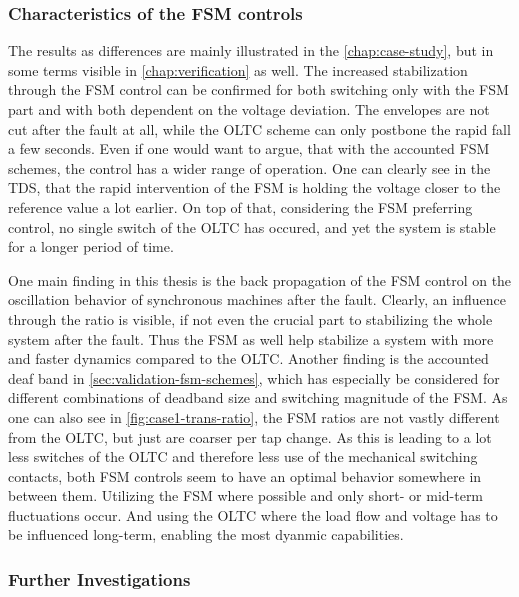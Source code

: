 \subsubsection{Characteristics of the FSM controls}

The results as differences are mainly illustrated in the \autoref{chap:case-study}, but in some terms visible in \autoref{chap:verification} as well.
The increased stabilization through the \acs{FSM} control can be confirmed for both switching only with the \acs{FSM} part and with both dependent on the voltage deviation.
The envelopes are not cut after the fault at all, while the \acs{OLTC} scheme can only postbone the rapid fall a few seconds.
Even if one would want to argue, that with the accounted \acs{FSM} schemes, the control has a wider range of operation.
One can clearly see in the \acs{TDS}, that the rapid intervention of the \acs{FSM} is holding the voltage closer to the reference value a lot earlier.
On top of that, considering the \acs{FSM} preferring control, no single switch of the \acs{OLTC} has occured, and yet the system is stable for a longer period of time.

One main finding in this thesis is the back propagation of the \acs{FSM} control on the oscillation behavior of synchronous machines after the fault.
Clearly, an influence through the ratio is visible, if not even the crucial part to stabilizing the whole system after the fault.
Thus the \acs{FSM} as well help stabilize a system with more and faster dynamics compared to the \acs{OLTC}.
Another finding is the accounted deaf band in \autoref{sec:validation-fsm-schemes}, which has especially be considered for different combinations of deadband size and switching magnitude of the \acs{FSM}.
As one can also see in \autoref{fig:case1-trans-ratio}, the \acs{FSM} ratios are not vastly different from the \acs{OLTC}, but just are coarser per tap change.
As this is leading to a lot less switches of the \acs{OLTC} and therefore less use of the mechanical switching contacts, both \acs{FSM} controls seem to have an optimal behavior somewhere in between them.
Utilizing the \acs{FSM} where possible and only short- or mid-term fluctuations occur.
And using the \acs{OLTC} where the load flow and voltage has to be influenced long-term, enabling the most dyanmic capabilities.   

\subsubsection{Further Investigations}

